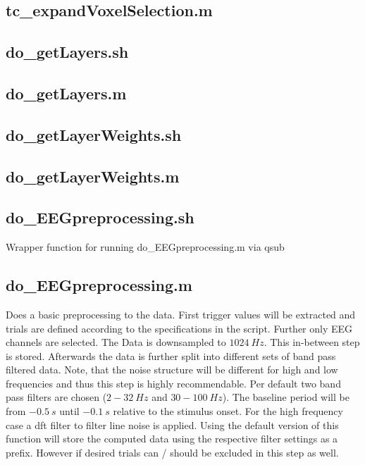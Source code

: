 \documentclass[12pt,a4paper]{scrartcl}
\begin{document}
\subsection{tc\_expandVoxelSelection.m}

\subsection{do\_getLayers.sh}
\label{sec:getLyr}

\subsection{do\_getLayers.m}

\subsection{do\_getLayerWeights.sh}
\label{sec:getLyrW}

\subsection{do\_getLayerWeights.m}

\subsection{do\_EEGpreprocessing.sh}
\label{sec:EEGpreproc}
Wrapper function for running do\_EEGpreprocessing.m via qsub

\subsection{do\_EEGpreprocessing.m}
Does a basic preprocessing to the data. First trigger values will be extracted and trials are defined according to the specifications in the script. Further only EEG channels are selected. The Data is downsampled to $1024~Hz$. This in-between step is stored. Afterwards the data is further split into different sets of band pass filtered data. Note, that the noise structure will be different for high and low frequencies and thus this step is highly recommendable. Per default two band pass filters are chosen ($2-32~Hz$ and $30-100~Hz$). The baseline period will be from $-0.5~s$ until $-0.1~s$ relative to the stimulus onset. For the high frequency case a dft filter to filter line noise is applied. Using the default version of this function will store the computed data using the respective filter settings as a prefix. However if desired trials can / should be excluded in this step as well.\\
\end{document}
